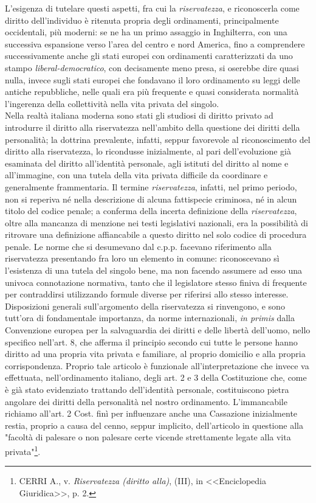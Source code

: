 L'esigenza di tutelare questi aspetti, fra cui la \textit{riservatezza}, e riconoscerla come diritto dell'individuo è ritenuta propria degli ordinamenti, principalmente occidentali, più moderni: se ne ha un primo assaggio in Inghilterra, con una successiva espansione verso l'area del centro e nord America, fino a comprendere successivamente anche gli stati europei con ordinamenti caratterizzati da uno stampo \textit{liberal-democratico}, con decisamente meno presa, si oserebbe dire quasi nulla, invece sugli stati europei che fondavano il loro ordinamento su leggi delle antiche repubbliche, nelle quali era più frequente e quasi considerata normalità l'ingerenza della collettività nella vita privata del singolo.
\\Nella realtà italiana moderna sono stati gli studiosi di diritto privato ad introdurre il diritto alla riservatezza nell'ambito della questione dei diritti della personalità; la dottrina prevalente, infatti, seppur favorevole al riconoscimento del diritto alla riservatezza, lo ricondusse inizialmente, al pari dell'evoluzione già esaminata del diritto all'identità personale, agli istituti del diritto al nome e all'immagine, con una tutela della vita privata difficile da coordinare e generalmente frammentaria. 
Il termine \textit{riservatezza}, infatti, nel primo periodo, non si reperiva né nella descrizione di alcuna fattispecie criminosa, né in alcun titolo del codice penale; a conferma della incerta definizione della \textit{riservatezza}, oltre alla mancanza di menzione nei testi legislativi nazionali, era la possibilità di ritrovare una definizione affiancabile a questo diritto nel solo codice di procedura penale.%
Le norme che si desumevano dal c.p.p. facevano riferimento alla riservatezza presentando fra loro un elemento in comune: riconoscevano sì l'esistenza di una tutela del singolo bene, ma non facendo assumere ad esso una univoca connotazione normativa, tanto che il legislatore stesso finiva di frequente per contraddirsi utilizzando formule diverse per riferirsi allo stesso interesse.
\\Disposizioni generali sull'argomento della riservatezza si rinvengono, e sono tutt'ora di fondamentale importanza, da norme internazionali, \textit{in primis} dalla Convenzione europea per la salvaguardia dei diritti e delle libertà dell'uomo, nello specifico nell'art. 8, che afferma il principio secondo cui tutte le persone hanno diritto ad una propria vita privata e familiare, al proprio domicilio e alla propria corrispondenza. Proprio tale articolo è funzionale all'interpretazione che invece va effettuata, nell'ordinamento italiano, degli art. 2 e 3 della Costituzione che, come è già stato evidenziato trattando dell'identità personale, costituiscono pietra angolare dei diritti della personalità nel nostro ordinamento. L'immancabile richiamo all'art. 2 Cost. finì per influenzare anche una Cassazione inizialmente restia, proprio a causa del cenno, seppur implicito, dell'articolo in questione alla "facoltà di palesare o non palesare certe vicende strettamente legate alla vita privata"\footnote{CERRI A., v. \textit{Riservatezza (diritto alla)}, (III), in <<Enciclopedia Giuridica>>, p. 2.}.
